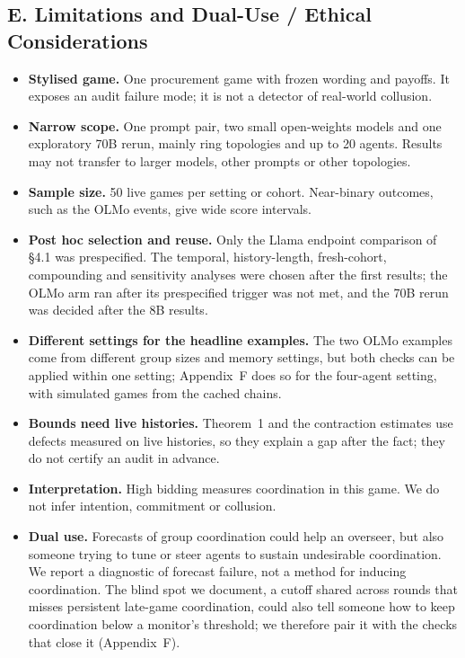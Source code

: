 \documentclass[11pt,letterpaper]{article}
\begin{document}
\subsection{E. Limitations and Dual-Use / Ethical Considerations}

\begin{itemize}
  \item \textbf{Stylised game.} One procurement game with frozen wording and payoffs.
    It exposes an audit failure mode; it is not a detector of real-world collusion.
  \item \textbf{Narrow scope.} One prompt pair, two small open-weights models and one exploratory 70B rerun, mainly ring topologies and up to 20 agents.
    Results may not transfer to larger models, other prompts or other topologies.
  \item \textbf{Sample size.} 50 live games per setting or cohort.
    Near-binary outcomes, such as the OLMo events, give wide score intervals.
  \item \textbf{Post hoc selection and reuse.} Only the Llama endpoint comparison of §4.1 was prespecified.
    The temporal, history-length, fresh-cohort, compounding and sensitivity analyses were chosen after the first results; the OLMo arm ran after its prespecified trigger was not met, and the 70B rerun was decided after the 8B results.
  \item \textbf{Different settings for the headline examples.} The two OLMo examples come from different group sizes and memory settings, but both checks can be applied within one setting; Appendix~F does so for the four-agent setting, with simulated games from the cached chains.
  \item \textbf{Bounds need live histories.} Theorem~1 and the contraction estimates use defects measured on live histories, so they explain a gap after the fact; they do not certify an audit in advance.
  \item \textbf{Interpretation.} High bidding measures coordination in this game.
    We do not infer intention, commitment or collusion.
  \item \textbf{Dual use.} Forecasts of group coordination could help an overseer, but also someone trying to tune or steer agents to sustain undesirable coordination.
    We report a diagnostic of forecast failure, not a method for inducing coordination.
    The blind spot we document, a cutoff shared across rounds that misses persistent late-game coordination, could also tell someone how to keep coordination below a monitor's threshold; we therefore pair it with the checks that close it (Appendix~F).
\end{itemize}
\end{document}
